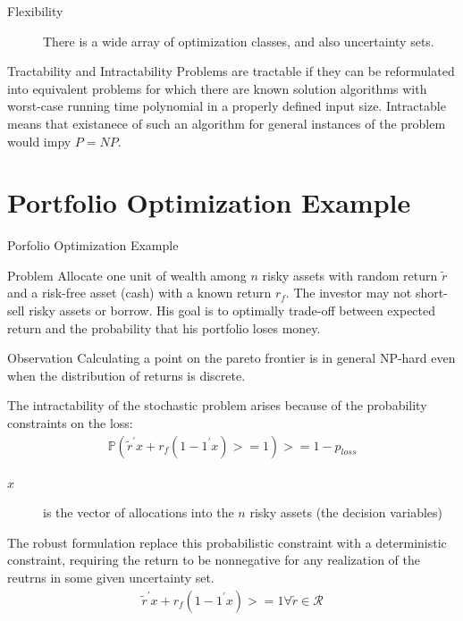\documentclass{beamer}
\begin{document}
\begin{frame}
\begin{description}
\item [Flexibility] There is a wide array of optimization classes, and also uncertainty sets.
\end{description}

\begin{block}{Tractability and Intractability}
Problems are tractable if they can be reformulated into equivalent problems for which there are known solution algorithms with worst-case running time polynomial in a properly defined input size. Intractable means that existanece of such an algorithm for general instances of the problem would impy $P=NP$.
\end{block}
\end{frame}

\section{Portfolio Optimization Example}

\begin{frame}{Porfolio Optimization Example}
\begin{block}{Problem}
Allocate one unit of wealth among $n$ risky assets with random return $\tilde{r}$ and a risk-free asset (cash) with a known return $r_{f}$. The investor may not short-sell risky assets or borrow. His goal is to optimally trade-off between expected return and the probability that his portfolio loses money.
\end{block}

\begin{block}{Observation}
Calculating a point on the pareto frontier is in general NP-hard even when the distribution of returns is discrete.
\end{block}
\end{frame}

\begin{frame}{}
The intractability of the stochastic problem arises because of the probability constraints on the loss:
\begin{align*}
\mathbb{P}(\tilde{r}^{'}x + r_{f}(1 - 1^{'}x) >= 1) >= 1 - p_{loss}
\end{align*}
\begin{description}
\item [$x$] is the vector of allocations into the $n$ risky assets (the decision variables)
\end{description}

The robust formulation replace this probabilistic constraint with a deterministic constraint, requiring the return to be nonnegative for any realization of the reutrns in some given uncertainty set.
\begin{align*}
\tilde{r}^{'}x + r_{f}(1 - 1^{'}x) >= 1 \forall \tilde{r} \in \mathcal{R}
\end{align*}
\end{frame}
\end{document}
